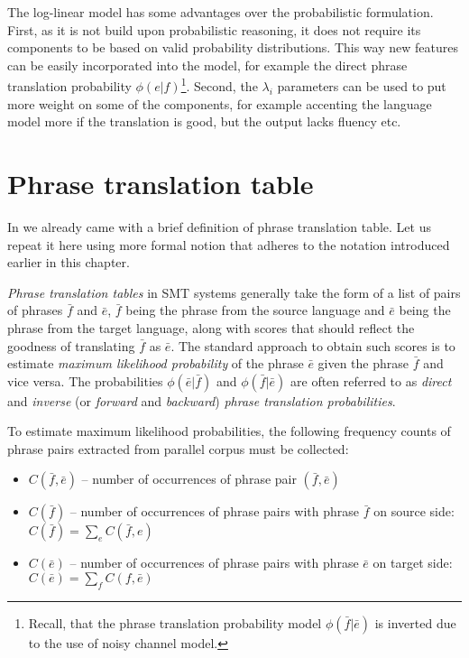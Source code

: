 The log-linear model has some advantages over the probabilistic formulation.
First, as it is not build upon probabilistic reasoning, it does not require its
components to be based on valid probability distributions.
This way new features can be easily incorporated into the model, for example the direct
phrase translation probability $\phi(e|f)$\footnote{Recall, that the phrase translation
probability model $\phi(\bar{f}|\bar{e})$ is inverted due to the use of noisy channel model.}.
Second, the $\lambda_i$ parameters can be used to put more weight on some of the components,
for example accenting the language model more if the translation is good, but the output
lacks fluency etc.

\section{Phrase translation table}


In  we already came with a brief definition of phrase
translation table. Let us repeat it here using more formal notion that adheres
to the notation introduced earlier in this chapter.

\emph{Phrase translation tables} in SMT systems generally take the form of a list of
pairs of phrases $\bar{f}$ and $\bar{e}$, $\bar{f}$ being the phrase from the source
language and $\bar{e}$ being the phrase from the target language, along with scores
that should reflect the goodness of translating $\bar{f}$ as $\bar{e}$.
The standard approach to obtain such scores is to estimate \emph{maximum likelihood
probability} of the phrase $\bar{e}$ given the phrase $\bar{f}$ and vice versa.
The probabilities $\phi(\bar{e}|\bar{f})$ and $\phi(\bar{f}|\bar{e})$ are often
referred to as \emph{direct} and \emph{inverse} (or \emph{forward} and \emph{backward})
\emph{phrase translation probabilities}.

To estimate maximum likelihood probabilities, the following frequency counts
of phrase pairs extracted from parallel corpus must be collected:
\begin{itemize}
  \item $C(\bar{f},\bar{e})$ -- number of occurrences of phrase pair $(\bar{f},\bar{e})$
  \item $C(\bar{f})$ -- number of occurrences of phrase pairs with phrase $\bar{f}$ on source side:
    $C(\bar{f}) = \sum_{e}{C(\bar{f},e)}$
  \item $C(\bar{e})$ -- number of occurrences of phrase pairs with phrase $\bar{e}$ on target side:
    $C(\bar{e}) = \sum_{f}{C(f,\bar{e})}$
\end{itemize}

